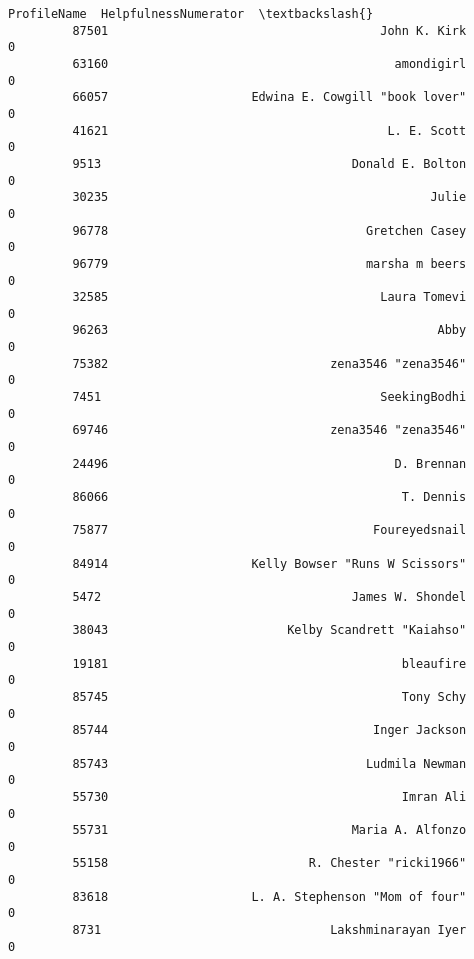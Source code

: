 \documentclass[11pt]{article}
\begin{document}
\begin{Verbatim}[commandchars=\\\{\}]
                                                     ProfileName  HelpfulnessNumerator  \textbackslash{}
         87501                                      John K. Kirk                     0   
         63160                                        amondigirl                     0   
         66057                    Edwina E. Cowgill "book lover"                     0   
         41621                                       L. E. Scott                     0   
         9513                                   Donald E. Bolton                     0   
         30235                                             Julie                     0   
         96778                                    Gretchen Casey                     0   
         96779                                    marsha m beers                     0   
         32585                                      Laura Tomevi                     0   
         96263                                              Abby                     0   
         75382                               zena3546 "zena3546"                     0   
         7451                                       SeekingBodhi                     0   
         69746                               zena3546 "zena3546"                     0   
         24496                                        D. Brennan                     0   
         86066                                         T. Dennis                     0   
         75877                                     Foureyedsnail                     0   
         84914                    Kelly Bowser "Runs W Scissors"                     0   
         5472                                   James W. Shondel                     0   
         38043                         Kelby Scandrett "Kaiahso"                     0   
         19181                                         bleaufire                     0   
         85745                                         Tony Schy                     0   
         85744                                     Inger Jackson                     0   
         85743                                    Ludmila Newman                     0   
         55730                                         Imran Ali                     0   
         55731                                  Maria A. Alfonzo                     0   
         55158                            R. Chester "ricki1966"                     0   
         83618                    L. A. Stephenson "Mom of four"                     0   
         8731                                Lakshminarayan Iyer                     0   

\end{Verbatim}
\end{document}
